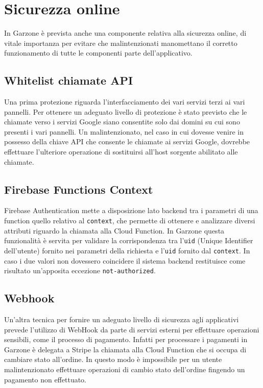 \section{Sicurezza online}
In Garzone è prevista anche una componente relativa alla sicurezza online, di vitale importanza per evitare che malintenzionati manomettano il corretto funzionamento di tutte le componenti parte dell'applicativo.
\subsection{Whitelist chiamate API}
Una prima protezione riguarda l'interfacciamento dei vari servizi terzi ai vari pannelli. Per ottenere un adeguato livello di protezione è stato previsto che le chiamate verso i servizi Google siano consentite solo dai domini su cui sono presenti i vari pannelli. Un malintenzionato, nel caso in cui dovesse venire in possesso della chiave API che consente le chiamate ai servizi Google, dovrebbe effettuare l'ulteriore operazione di sostituirsi all'host sorgente abilitato alle chiamate. 
\subsection{Firebase Functions Context}
Firebase Authentication mette a disposizione lato backend tra i parametri di una function quello relativo al \lstinline[basicstyle=\ttfamily]!context!, che permette di ottenere e analizzare diversi attributi riguardo la chiamata alla Cloud Function. In Garzone questa funzionalità è servita per validare la corrispondenza tra l'\lstinline[basicstyle=\ttfamily]!uid! (Unique Identifier dell'utente) fornito nei parametri della richiesta e l'\lstinline[basicstyle=\ttfamily]!uid! fornito dal \lstinline[basicstyle=\ttfamily]!context!. In caso i due valori non dovessero coincidere il sistema backend restituisce come risultato un'apposita eccezione \lstinline[basicstyle=\ttfamily]!not-authorized!.
\subsection{Webhook}
Un'altra tecnica per fornire un adeguato livello di sicurezza agli applicativi prevede l'utilizzo di WebHook da parte di servizi esterni per effettuare operazioni sensibili, come il processo di pagamento. Infatti per processare i pagamenti in Garzone è delegata a Stripe la chiamata alla Cloud Function che si occupa di cambiare stato all'ordine. In questo modo è impossibile per un utente malintenzionato effettuare operazioni di cambio stato dell'ordine fingendo un pagamento non effettuato. 
